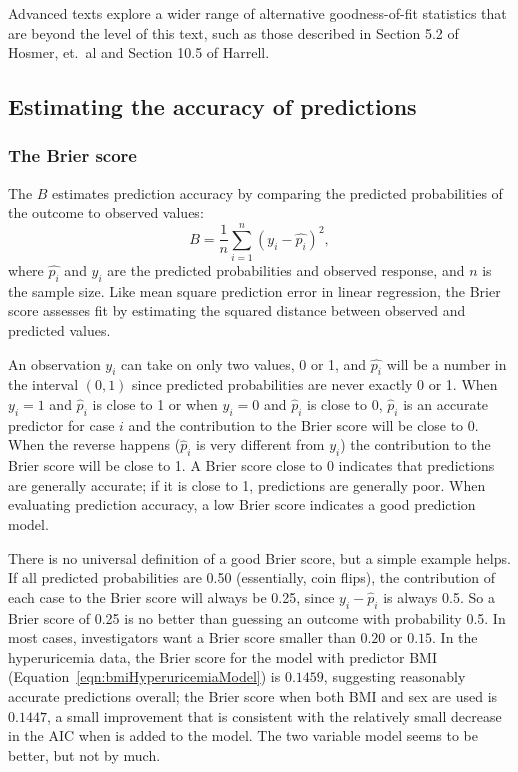  Advanced texts explore a wider range of alternative goodness-of-fit statistics that are beyond the level of this text, such as those described in Section 5.2 of Hosmer, et.\ al and Section 10.5 of Harrell.

\subsection{Estimating the accuracy of predictions}
\label{section:predictiveAccuracyLogistic}

 \subsubsection{The Brier score}

The  $B$ estimates prediction accuracy by comparing the predicted probabilities of the outcome to observed values:
       \[ B = \dfrac{1}{n}\sum_{i = 1}^n (y_i - \hat{p_i})^2,  \]
where $\hat{p_i}$ and $y_i$ are the predicted probabilities and observed response, and $n$ is the sample size. Like mean square prediction error in linear regression, the Brier score assesses fit by estimating the squared distance between observed and predicted values.

An observation $y_i$ can take on only two values, 0 or 1, and $\hat{p_i}$ will be a number in the interval $(0,1)$ since predicted probabilities are never exactly 0 or 1.  When $y_i = 1$ and $\hat{p}_i$ is close to 1 or when $y_i = 0$ and  $\hat{p}_i$ is close to 0, $\hat{p}_i$ is an accurate predictor for case $i$ and the contribution to the Brier score will be close to 0.  When the reverse happens ($\hat{p}_i$ is very different from $y_i$) the contribution to the Brier score will be close to 1.  A Brier score close to 0 indicates that predictions are generally accurate; if it is close to 1, predictions are generally poor.  When evaluating prediction accuracy, a low Brier score indicates a good prediction model.

There is no universal definition of a good Brier score, but a simple example helps.  If all predicted probabilities are 0.50 (essentially, coin flips), the contribution of each case to the Brier score will always be 0.25, since $y_i - \hat{p}_i$ is always 0.5.  So a Brier score of 0.25 is no better than guessing an outcome with probability 0.5.  In most cases, investigators want a Brier score smaller than $0.20$ or $0.15$.  In the hyperuricemia data, the Brier score for the model with predictor BMI (Equation~\ref{eqn:bmiHyperuricemiaModel}) is $0.1459$, suggesting reasonably accurate predictions overall; the Brier score when both BMI and sex are used is $0.1447$, a small improvement that is consistent with the relatively small decrease in the AIC when  is added to the model.  The two variable model seems to be better, but not by much.

